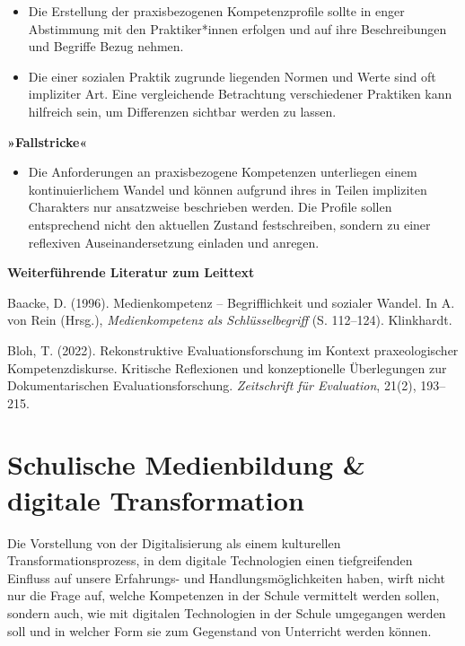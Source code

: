\documentclass[
  a4paper,
]{book}
\providecommand{\tightlist}{%
  \setlength{\itemsep}{0pt}\setlength{\parskip}{0pt}}
\begin{document}
\begin{itemize}
\tightlist
\item
  Die Erstellung der praxisbezogenen Kompetenzprofile sollte in enger Abstimmung mit den Praktiker*innen erfolgen und auf ihre Beschreibungen und Begriffe Bezug nehmen.
\item
  Die einer sozialen Praktik zugrunde liegenden Normen und Werte sind oft impliziter Art. Eine vergleichende Betrachtung verschiedener Praktiken kann hilfreich sein, um Differenzen sichtbar werden zu lassen.
\end{itemize}

\textbf{»Fallstricke«}

\begin{itemize}
\tightlist
\item
  Die Anforderungen an praxisbezogene Kompetenzen unterliegen einem kontinuierlichem Wandel und können aufgrund ihres in Teilen impliziten Charakters nur ansatzweise beschrieben werden. Die Profile sollen entsprechend nicht den aktuellen Zustand festschreiben, sondern zu einer reflexiven Auseinandersetzung einladen und anregen.
\end{itemize}

\textbf{Weiterführende Literatur zum Leittext}

Baacke, D. (1996). Medienkompetenz -- Begrifflichkeit und sozialer Wandel. In A. von Rein (Hrsg.), \emph{Medienkompetenz als Schlüsselbegriff} (S. 112--124). Klinkhardt.

Bloh, T. (2022). Rekonstruktive Evaluationsforschung im Kontext praxeologischer Kompetenzdiskurse. Kritische Reflexionen und konzeptionelle Überlegungen zur Dokumentarischen Evaluationsforschung. \emph{Zeitschrift für Evaluation}, 21(2), 193--215.

\chapter{Schulische Medienbildung \& digitale Transformation}\label{schulische-medienbildung-digitale-transformation}

Die Vorstellung von der Digitalisierung als einem kulturellen Transformationsprozess, in dem digitale Technologien einen tiefgreifenden Einfluss auf unsere Erfahrungs- und Handlungsmöglichkeiten haben, wirft nicht nur die Frage auf, welche Kompetenzen in der Schule vermittelt werden sollen, sondern auch, wie mit digitalen Technologien in der Schule umgegangen werden soll und in welcher Form sie zum Gegenstand von Unterricht werden können.
\end{document}
